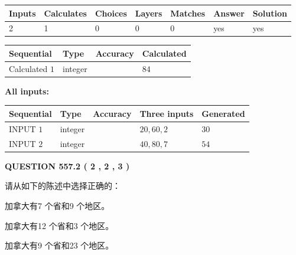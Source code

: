 \documentclass{ctexart}
\begin{document}
   
\noindent\begin{tabular}{|l|l|l|l|l|l|l|}
 \hline
Inputs & Calculates & Choices & Layers & Matches & Answer & Solution \\ \hline
 2  & 
 1  & 
 0
  & 
 0  & 
 0  & 
  yes & 
  yes 
  \\ \hline
 \end{tabular}
   
   
   
   
\noindent{}
   
   
  
  
\noindent\begin{tabular}{|l|l|l|l|}
\hline
 Sequential & Type & Accuracy & Calculated \\ 
\hline
 
 
  Calculated $  1 $ & integer &  & 
  $ 84 $ 
 \\  \hline  
 \end{tabular}
   
   
   
   
\noindent\vspace{0.1in}\hspace{-0.08in} {\textbf{\Large{All inputs: }}}
   
   
  
  
\noindent\begin{tabular}{|l|l|l|l|l|}
\hline
 Sequential & Type & Accuracy & Three inputs & Generated \\ 
\hline
 
 
  INPUT $  1 $ & integer &  & $
 20
 , 
 60
 , 
 2
 $ & $ 30 $ 
 \\  \hline  
 
 
  INPUT $  2 $ & integer &  & $
 40
 , 
 80
 , 
 7
 $ & $ 54 $ 
 \\  \hline  
 \end{tabular}
   
   
  
\vspace{0.2in}
  
{\textbf{\Large{QUESTION
557.2 
 ( 2 , 2 , 3 )
}}}
  
  
请从如下的陈述中选择正确的：
 
 
加拿大有7 个省和9 个地区。
 
 
加拿大有12 个省和3 个地区。
 
 
加拿大有9 个省和23 个地区。
 
\end{document}
